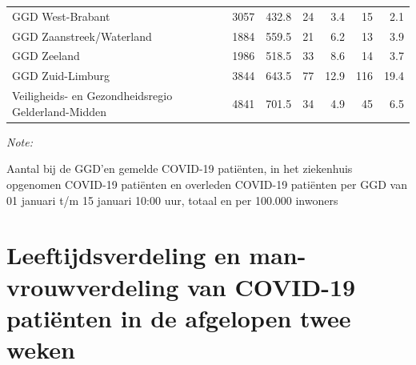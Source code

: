 \documentclass[
  english,
  man,floatsintext]{apa6}
\begin{document}
\begin{table}[H]
\begin{threeparttable}
\begin{tabular}{lrrrrrr}
GGD West-Brabant & 3057 & 432.8 & 24 & 3.4 & 15 & 2.1\\
GGD Zaanstreek/Waterland & 1884 & 559.5 & 21 & 6.2 & 13 & 3.9\\
GGD Zeeland & 1986 & 518.5 & 33 & 8.6 & 14 & 3.7\\
GGD Zuid-Limburg & 3844 & 643.5 & 77 & 12.9 & 116 & 19.4\\
Veiligheids- en Gezondheidsregio Gelderland-Midden & 4841 & 701.5 & 34 & 4.9 & 45 & 6.5\\
\bottomrule
\end{tabular}
\begin{tablenotes}
\item \textit{Note: } 
\item Aantal bij de GGD’en gemelde COVID-19 patiënten, in het ziekenhuis opgenomen COVID-19 patiënten en overleden COVID-19 patiënten per GGD van 01 januari t/m 15 januari 10:00 uur, totaal en per 100.000 inwoners
\end{tablenotes}
\end{threeparttable}
\endgroup{}
\end{table}

\newpage

\hypertarget{leeftijdsverdeling-en-man-vrouwverdeling-van-covid-19-patiuxebnten-in-de-afgelopen-twee-weken}{%
\section{Leeftijdsverdeling en man-vrouwverdeling van COVID-19 patiënten in de afgelopen twee weken}\label{leeftijdsverdeling-en-man-vrouwverdeling-van-covid-19-patiuxebnten-in-de-afgelopen-twee-weken}}
\end{document}
